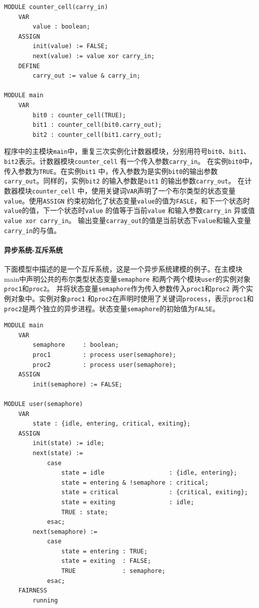 \begin{lstlisting}
MODULE counter_cell(carry_in)
    VAR
        value : boolean;
    ASSIGN
        init(value) := FALSE;
        next(value) := value xor carry_in;
    DEFINE
        carry_out := value & carry_in;

MODULE main
    VAR
        bit0 : counter_cell(TRUE);
        bit1 : counter_cell(bit0.carry_out);
        bit2 : counter_cell(bit1.carry_out);
\end{lstlisting}

程序中的主模块\verb|main|中，重复三次实例化计数器模块，分别用符号\verb|bit0|、\verb|bit1|、\verb|bit2|表示。计数器模块\verb|counter_cell| 有一个传入参数\verb|carry_in|。 在实例\verb|bit0|中，传入参数为\verb|TRUE|。在实例\verb|bit1| 中，传入参数为是实例\verb|bit0|的输出参数\verb|carry_out|。同样的，实例\verb|bit2| 的输入参数是\verb|bit1| 的输出参数\verb|carry_out|。 在计数器模块\verb|counter_cell| 中，使用关键词\verb|VAR|声明了一个布尔类型的状态变量\verb|value|。使用\verb|ASSIGN| 约束初始化了状态变量\verb|value|的值为\verb|FASLE|，和下一个状态时\verb|value|的值，下一个状态时\verb|value| 的值等于当前\verb|value| 和输入参数\verb|carry_in| 异或值\verb|value xor carry_in|。 输出变量\verb|carray_out|的值是当前状态下\verb|value|和输入变量\verb|carry_in|的与值。

\paragraph{异步系统-互斥系统}
下面模型中描述的是一个互斥系统，这是一个异步系统建模的例子。在主模块main中声明公共的布尔类型状态变量\verb|semaphore| 和两个两个模块\verb|user|的实例对象\verb|proc1|和\verb|proc2|。 并将状态变量\verb|semaphore|作为传入参数传入\verb|proc1|和\verb|proc2| 两个实例对象中。实例对象\verb|proc1| 和\verb|proc2|在声明时使用了关键词\verb|process|，表示\verb|proc1|和\verb|proc2|是两个独立的异步进程。状态变量\verb|semaphore|的初始值为\verb|FALSE|。

\begin{lstlisting}
MODULE main
    VAR
        semaphore     : boolean;
        proc1         : process user(semaphore);
        proc2         : process user(semaphore);
    ASSIGN
        init(semaphore) := FALSE;

MODULE user(semaphore)
    VAR
        state : {idle, entering, critical, exiting};
    ASSIGN
        init(state) := idle;
        next(state) :=
            case
                state = idle                  : {idle, entering};
                state = entering & !semaphore : critical;
                state = critical              : {critical, exiting};
                state = exiting               : idle;
                TRUE : state;
            esac;
        next(semaphore) :=
            case
                state = entering : TRUE;
                state = exiting  : FALSE;
                TRUE             : semaphore;
            esac;
    FAIRNESS
        running
\end{lstlisting}

